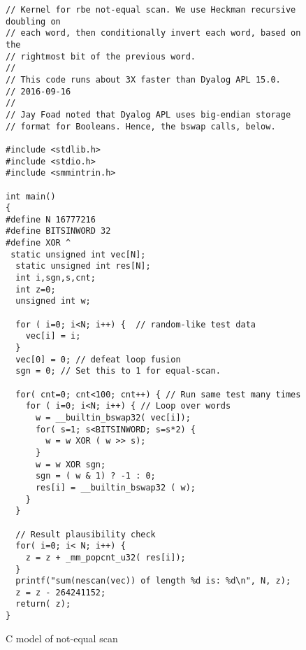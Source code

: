 %

\begin{figure}
\begin{small}
\begin{verbatim}
// Kernel for rbe not-equal scan. We use Heckman recursive doubling on
// each word, then conditionally invert each word, based on the 
// rightmost bit of the previous word.
//
// This code runs about 3X faster than Dyalog APL 15.0.
// 2016-09-16
// 
// Jay Foad noted that Dyalog APL uses big-endian storage
// format for Booleans. Hence, the bswap calls, below.

#include <stdlib.h>
#include <stdio.h>
#include <smmintrin.h>

int main()
{
#define N 16777216
#define BITSINWORD 32
#define XOR ^
 static unsigned int vec[N];
  static unsigned int res[N];
  int i,sgn,s,cnt;
  int z=0;
  unsigned int w;

  for ( i=0; i<N; i++) {  // random-like test data
    vec[i] = i;
  }
  vec[0] = 0; // defeat loop fusion
  sgn = 0; // Set this to 1 for equal-scan.

  for( cnt=0; cnt<100; cnt++) { // Run same test many times
    for ( i=0; i<N; i++) { // Loop over words
      w = __builtin_bswap32( vec[i]);
      for( s=1; s<BITSINWORD; s=s*2) { 
        w = w XOR ( w >> s);
      }
      w = w XOR sgn;
      sgn = ( w & 1) ? -1 : 0;
      res[i] = __builtin_bswap32 ( w); 
    }
  }

  // Result plausibility check
  for( i=0; i< N; i++) {
    z = z + _mm_popcnt_u32( res[i]);
  }
  printf("sum(nescan(vec)) of length %d is: %d\n", N, z);
  z = z - 264241152;
  return( z);
} 
\end{verbatim}
\end{small}
\caption{C model of not-equal scan}
\label{nescanc}
\end{figure}

